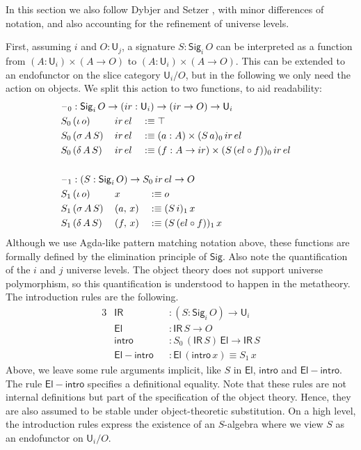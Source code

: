 \documentclass[acmsmall,screen,review,anonymous]{acmart}
\newcommand{\msf}[1]{{\mathsf{#1}}}
\newcommand{\U}{\msf{U}}
\newcommand{\El}{\msf{El}}
\newcommand{\Sig}{\msf{Sig}}
\newcommand{\blank}{{\mathord{\hspace{1pt}\text{--}\hspace{1pt}}}}
\newcommand{\ir}{{ir}}
\newcommand{\el}{{el}}
\newcommand{\IR}{\msf{IR}}
\newcommand{\intro}{\msf{intro}}
\begin{document}
In this section we also follow Dybjer and Setzer \cite{TODO}, with minor differences of notation, and
also accounting for the refinement of universe levels.

First, assuming $i$ and $O : \U_j$, a signature $S : \Sig_i\,O$ can be interpreted as a function
from $(A : \U_i) \times (A \to O)$ to $(A : \U_i) \times (A \to O)$. This can be extended to an
endofunctor on the slice category $\U_i/O$, but in the following we only need the action on
objects. We split this action to two functions, to aid readability:
\begin{alignat*}{3}
  &\rlap{$\blank_0 : \Sig_i\,O \to (\ir : \U_i) \to (\ir \to O) \to \U_i$} \\
  &S_0\,(\iota\,o)    \,&&\ir\,\el && \hspace{-0.7em}:\equiv \top\\
  &S_0\,(\sigma\,A\,S)\,&&\ir\,\el && \hspace{-0.7em}:\equiv (a : A) \times (S\,a)_0\,\ir\,\el\\
  &S_0\,(\delta\,A\,S)\,&&\ir\,\el && \hspace{-0.7em}:\equiv (f : A \to \ir) \times (S\,(\el \circ f))_0\,\ir\,\el\\
  & && &&\\
  &\rlap{$\blank_1 : (S : \Sig_i\,O) \to S_0\,\ir\,\el \to O$} \\
  &S_1\,(\iota\,o)    \,&&x       && :\equiv o\\
  &S_1\,(\sigma\,A\,S)\,&&(a,\,x) && :\equiv (S\,i)_1\,x\\
  &S_1\,(\delta\,A\,S)\,&&(f,\,x) && :\equiv (S\,(\el \circ f))_1\,x
\end{alignat*}
Although we use Agda-like pattern matching notation above, these functions are formally defined by
the elimination principle of $\Sig$. Also note the quantification of the $i$ and $j$ universe
levels. The object theory does not support universe polymorphism, so this quantification is
understood to happen in the metatheory. The introduction rules are the following.
\begin{alignat*}{3}
  &\IR                && : (S : \Sig_i\,O) \to \U_i\\
  &\El                && : \IR\,S \to O\\
  &\intro             && : S_0\,(\IR\,S)\,\El \to \IR\,S\\
  &\msf{El\!\!-\!\!intro} && : \El\,(\intro\,x) \equiv S_1\,x
\end{alignat*}
Above, we leave some rule arguments implicit, like $S$ in $\El$, $\intro$ and
$\msf{El\!\!-\!\!intro}$. The rule $\msf{El\!\!-\!\!intro}$ specifies a definitional equality.  Note
that these rules are not internal definitions but part of the specification of the object
theory. Hence, they are also assumed to be stable under object-theoretic substitution. On a high
level, the introduction rules express the existence of an $S$-algebra where we view $S$ as an
endofunctor on $\U_i/O$.
\end{document}
